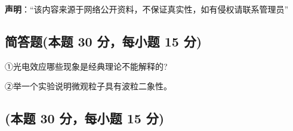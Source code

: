 
\textbf{声明}：“该内容来源于网络公开资料，不保证真实性，如有侵权请联系管理员”

\subsection{简答题(本题 30 分，每小题 15 分)}
①光电效应哪些现象是经典理论不能解释的?

②举一个实验说明微观粒子具有波粒二象性。
\subsection{(本题 30 分，每小题 15 分)}
